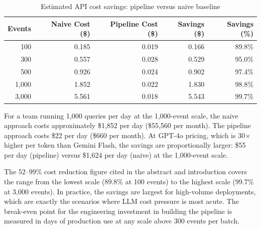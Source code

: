 \begin{table}[H]
\centering
\caption{Estimated API cost savings: pipeline versus naive baseline}
\label{tab:cost_savings}
\begin{tabular}{rrrrr}
\toprule
\textbf{Events} & \textbf{Naive Cost (\$)} & \textbf{Pipeline Cost (\$)} & \textbf{Savings (\$)} & \textbf{Savings (\%)} \\
\midrule
100   & 0.185 & 0.019 & 0.166 & 89.8\% \\
300   & 0.557 & 0.028 & 0.529 & 95.0\% \\
500   & 0.926 & 0.024 & 0.902 & 97.4\% \\
1,000 & 1.852 & 0.022 & 1.830 & 98.8\% \\
3,000 & 5.561 & 0.018 & 5.543 & 99.7\% \\
\bottomrule
\end{tabular}
\end{table}

For a team running 1,000 queries per day at the 1,000-event scale, the naive approach
costs approximately \$1,852 per day (\$55,560 per month). The pipeline approach costs
\$22 per day (\$660 per month). At GPT-4o pricing, which is 30$\times$ higher per token
than Gemini Flash, the savings are proportionally larger: \$55 per day (pipeline) versus
\$1,624 per day (naive) at the 1,000-event scale.

The 52--99\% cost reduction figure cited in the abstract and introduction covers the range
from the lowest scale (89.8\% at 100 events) to the highest scale (99.7\% at 3,000 events).
In practice, the savings are largest for high-volume deployments, which are exactly the
scenarios where LLM cost pressure is most acute. The break-even point for the engineering
investment in building the pipeline is measured in days of production use at any scale
above 300 events per batch.
